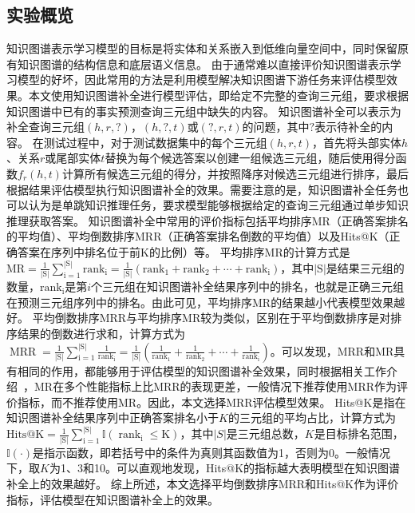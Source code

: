 \documentclass[algorithmlist, AutoFakeBold, AutoFakeSlant, figurelist, tablelist, nomlist, engineering]{seuthesix}
\begin{document}
\subsection{实验概览}
知识图谱表示学习模型的目标是将实体和关系嵌入到低维向量空间中，同时保留原有知识图谱的结构信息和底层语义信息。
由于通常难以直接评价知识图谱表示学习模型的好坏，因此常用的方法是利用模型解决知识图谱下游任务来评估模型效果。本文使用知识图谱补全进行模型评估，即给定不完整的查询三元组，要求根据知识图谱中已有的事实预测查询三元组中缺失的内容。
知识图谱补全可以表示为补全查询三元组$\left(h, r, ?\right)$，$(h, ?, t)$或$\left(?, r, t\right)$的问题，其中$?$表示待补全的内容。
在测试过程中，对于测试数据集中的每个三元组$(h, r, t)$，首先将头部实体$h$、关系$r$或尾部实体$t$替换为每个候选答案以创建一组候选三元组，随后使用得分函数$f_r\left(h, t\right)$计算所有候选三元组的得分，并按照降序对候选三元组进行排序，最后根据结果评估模型执行知识图谱补全的效果。需要注意的是，知识图谱补全任务也可以认为是单跳知识推理任务，要求模型能够根据给定的查询三元组通过单步知识推理获取答案。
知识图谱补全中常用的评价指标包括平均排序MR（正确答案排名的平均值）、平均倒数排序MRR（正确答案排名倒数的平均值）以及Hits@K（正确答案在序列中排名位于前K的比例）等。
平均排序MR的计算方式是$\mathrm{MR}=\frac{1}{|\mathrm{S}|} \sum_{\mathrm{i}=1}^{|\mathrm{S}|} \mathrm{rank}_{\mathrm{i}}=\frac{1}{|\mathrm{S}|}\left(\mathrm{rank}_1+\mathrm{rank}_2+\cdots+\mathrm{rank}_{\mathrm{i}}\right)$，其中$|\mathrm{S}|$是结果三元组的数量，$\mathrm{rank}_{\mathrm{i}}$是第$i$个三元组在知识图谱补全结果序列中的排名，也就是正确三元组在预测三元组序列中的排名。由此可见，平均排序MR的结果越小代表模型效果越好。
平均倒数排序MRR与平均排序MR较为类似，区别在于平均倒数排序是对排序结果的倒数进行求和，计算方式为$\operatorname{MRR}=\frac{1}{|\mathrm{S}|} \sum_{\mathrm{i}=1}^{|\mathrm{S}|} \frac{1}{\mathrm{rank}_{\mathrm{i}}}=\frac{1}{|\mathrm{S}|}\left(\frac{1}{\mathrm{rank}_1}+\frac{1}{\mathrm{rank}_2}+\cdots+\frac{1}{\mathrm{rank}_{\mathrm{i}}}\right)$。可以发现，MRR和MR具有相同的作用，都能够用于评估模型的知识图谱补全效果，同时根据相关工作介绍~\cite{hoyt2022unified}，MR在多个性能指标上比MRR的表现更差，一般情况下推荐使用MRR作为评价指标，而不推荐使用MR。因此，本文选择MRR评估模型效果。
Hits@K是指在知识图谱补全结果序列中正确答案排名小于$K$的三元组的平均占比，计算方式为$\mathrm{Hits@K}=\frac{1}{|\mathrm{S}|} \sum_{\mathrm{i}=1}^{|\mathrm{S}|} \mathbb{I}\left(\operatorname{rank}_{\mathrm{i}} \leq \mathrm{K}\right)$，其中$|S|$是三元组总数，$K$是目标排名范围，$\mathbb{I}\left(\cdot\right)$是指示函数，即若括号中的条件为真则其函数值为1，否则为0。一般情况下，取$K$为1、3和10。可以直观地发现，Hits@K的指标越大表明模型在知识图谱补全上的效果越好。
综上所述，本文选择平均倒数排序MRR和Hits@K作为评价指标，评估模型在知识图谱补全上的效果。
\end{document}
